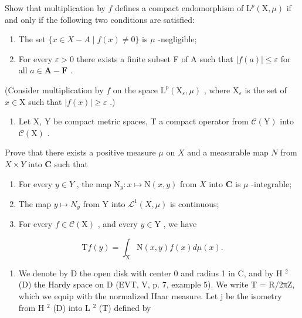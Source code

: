 Show that multiplication by \(f\) defines a compact endomorphism of \(\mathrm{L}^{p}(\mathrm{X},\mu)\) if and only if the following two conditions are satisfied:

\begin{enumerate}
\def\labelenumi{(\roman{enumi})}
\item
  The set \(\{x\in X-A\mid f(x)\neq0\}\) is \(\mu\) -negligible;
\item
  For every \(\varepsilon > 0\) there exists a finite subset F of A such that \(|f(a)| \leqslant \varepsilon\) for all \(a \in \mathbf{A} - \mathbf{F}\) .
\end{enumerate}

(Consider multiplication by \(f\) on the space \(\mathrm{L}^{p}(\mathrm{X}_{\varepsilon},\mu)\) , where \(\mathrm{X}_{\varepsilon}\) is the set of \(x\in\mathrm{X}\) such that \(|f(x)|\geqslant\varepsilon\) .)

\begin{enumerate}
\def\labelenumi{\arabic{enumi})}
\setcounter{enumi}{19}
\tightlist
\item
  Let X, Y be compact metric spaces, T a compact operator from \(\mathcal{C}(\mathrm{Y})\) into \(\mathcal{C}(\mathrm{X})\) .
\end{enumerate}

Prove that there exists a positive measure \(\mu\) on \(X\) and a measurable map \(N\) from \(X \times Y\) into \(\mathbf{C}\) such that

\begin{enumerate}
\def\labelenumi{\alph{enumi})}
\item
  For every \(y \in Y\) , the map \(\mathrm{N}_{y} \colon x \mapsto \mathrm{N}(x, y)\) from \(X\) into \(\mathbf{C}\) is \(\mu\) -integrable;
\item
  The map \(y \mapsto N_{y}\) from Y into \(\mathcal{L}^{1}(X, \mu)\) is continuous;
\item
  For every \(f \in \mathcal{C}(\mathrm{X})\) , and every \(y \in \mathrm{Y}\) , we have
\end{enumerate}

\[
\mathrm{T} f (y) = \int_ {\mathrm{X}} \mathrm{N} (x, y) f (x) d \mu (x).
\]

\begin{enumerate}
\def\labelenumi{\arabic{enumi})}
\setcounter{enumi}{20}
\tightlist
\item
  We denote by D the open disk with center 0 and radius 1 in C, and by H \(^{2}\) (D) the Hardy space on D (EVT, V, p. 7, example 5). We write T = R/2πZ, which we equip with the normalized Haar measure. Let j be the isometry from H \(^{2}\) (D) into L \(^{2}\) (T) defined by
\end{enumerate}

